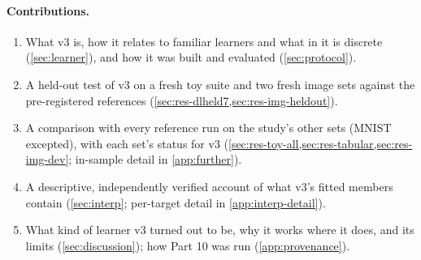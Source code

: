 \paragraph{Contributions.}
\begin{enumerate}
\item What v3 is, how it relates to familiar learners and what in it is discrete (\cref{sec:learner}), and how it was built and evaluated (\cref{sec:protocol}).
\item A held-out test of v3 on a fresh toy suite and two fresh image sets against the pre-registered references (\cref{sec:res-dlheld7,sec:res-img-heldout}).
\item A comparison with every reference run on the study's other sets (MNIST excepted), with each set's status for v3 (\cref{sec:res-toy-all,sec:res-tabular,sec:res-img-dev}; in-sample detail in \cref{app:further}).
\item A descriptive, independently verified account of what v3's fitted members contain (\cref{sec:interp}; per-target detail in \cref{app:interp-detail}).
\item What kind of learner v3 turned out to be, why it works where it does, and its limits (\cref{sec:discussion}); how Part 10 was run (\cref{app:provenance}).
\end{enumerate}
